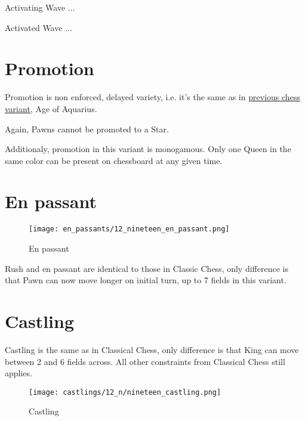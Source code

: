 Activating Wave ...

Activated Wave ...

\clearpage %

\section*{Promotion}

Promotion is non enforced, delayed variety, i.e. it's the same as in
\hyperref[sec:Age of Aquarius/Promotion]{previous chess variant}, Age of Aquarius.

Again, Pawns cannot be promoted to a Star.

Additionaly, promotion in this variant is monogamous.
Only one Queen in the same color can be present on chessboard at any given time.

\clearpage %

\section*{En passant}

\noindent
\begin{wrapfigure}{l}{0.4\textwidth}
\centering
\texttt{[image: en\_passants/12\_nineteen\_en\_passant.png]}
\caption{En passant}
\label{fig:12_nineteen_en_passant}
\end{wrapfigure}
Rush and en passant are identical to those in Classic Chess, only difference
is that Pawn can now move longer on initial turn, up to 7 fields in this
variant.

\clearpage %

\section*{Castling}

Castling is the same as in Classical Chess, only difference is that King can move between 2 and 6 fields across.
All other constraints from Classical Chess still applies.

\noindent
\begin{figure}[!h]
\texttt{[image: castlings/12\_n/nineteen\_castling.png]}
\caption{Castling}
\label{fig:nineteen_castling}
\end{figure}

